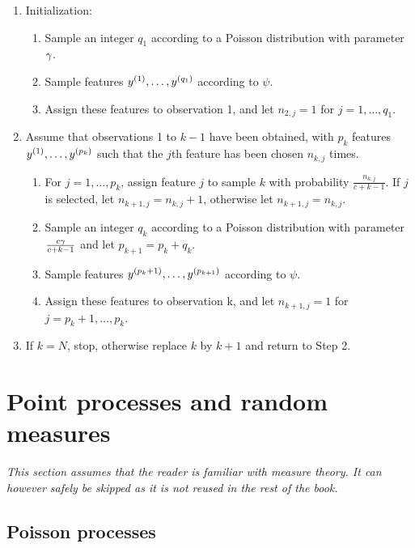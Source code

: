 \begin{algorithm}
\label{alg:indian.buffet}
\begin{enumerate}[label=\arabic*., wide=0.25cm]
\item Initialization:
\begin{enumerate}[label=(\roman*), wide=1cm]
\item Sample an integer $q_1$ according to a Poisson distribution with parameter $\gamma$.
\item Sample features $y^{(1)}, \ldots, y^{(q_1)}$ according to $\psi$.
\item Assign these features to observation 1, and let $n_{2,j} = 1$ for $j=1, \ldots, q_1$.
\end{enumerate}
\item Assume that observations 1 to $k-1$ have been obtained, with $p_k$ features $y^{(1)}, \ldots, y^{(p_k)}$ such that the $j$th feature has been chosen $n_{k,j}$ times.
\begin{enumerate}[label=(\roman*), wide=1cm]
\item For $j=1, \ldots, p_k$, assign feature $j$ to sample $k$ with probability $\frac{n_{k,j}}{c+k-1}$. If $j$ is selected, let $n_{k+1,j} = n_{k,j} +1$, otherwise let $n_{k+1,j} = n_{k,j}$.
\item Sample an integer $q_k$ according to a Poisson distribution with parameter $\frac{c\gamma}{c+k-1}$ and let $p_{k+1} = p_k + q_k$.
\item Sample features $y^{(p_k+1)}, \ldots, y^{(p_{k+1})}$ according to $\psi$.
\item Assign these features to observation k, and let $n_{k+1,j} = 1$ for $j=p_k+1, \ldots, p_k$.
\end{enumerate}
\item If $k=N$, stop, otherwise replace $k$ by $k+1$ and return to Step 2.
\end{enumerate}
\end{algorithm}


\section{Point processes and random measures}
{\em This section assumes that the reader is familiar with measure theory. It can however safely be skipped as it is not reused in the rest of the book.} 

\bigskip

\subsection{Poisson processes}

